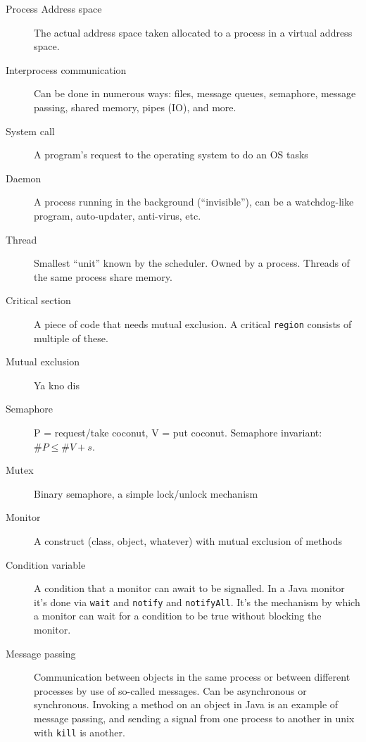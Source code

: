 \documentclass{article}
\begin{document}
\begin{description}
\item[Process Address space]
  The actual address space taken allocated to a process in a virtual address space.

\item[Interprocess communication]
  Can be done in numerous ways: files, message queues, semaphore, message passing, shared memory, pipes (IO), and more.

\item[System call]
  A program's request to the operating system to do an OS tasks

\item[Daemon]
  A process running in the background (``invisible''), can be a watchdog-like program, auto-updater, anti-virus, etc.

\item[Thread]
  Smallest ``unit'' known by the scheduler. Owned by a process. Threads of the same process share memory.

\item[Critical section]
  A piece of code that needs mutual exclusion. A critical \texttt{region} consists of multiple of these.

\item[Mutual exclusion]
  Ya kno dis

\item[Semaphore]
  P = request/take coconut, V = put coconut. Semaphore invariant: $\#P \le \#V + s$.

\item[Mutex]
  Binary semaphore, a simple lock/unlock mechanism

\item[Monitor]
  A construct (class, object, whatever) with mutual exclusion of methods

\item[Condition variable]
  A condition that a monitor can await to be signalled. In a Java monitor it's done via \texttt{wait} and \texttt{notify} and \texttt{notifyAll}. It's the mechanism by which a monitor can wait for a condition to be true without blocking the monitor.

\item[Message passing]
  Communication between objects in the same process or between different processes by use of so-called messages. Can be asynchronous or synchronous. Invoking a method on an object in Java is an example of message passing, and sending a signal from one process to another in unix with \texttt{kill} is another.


\end{description}
\end{document}
